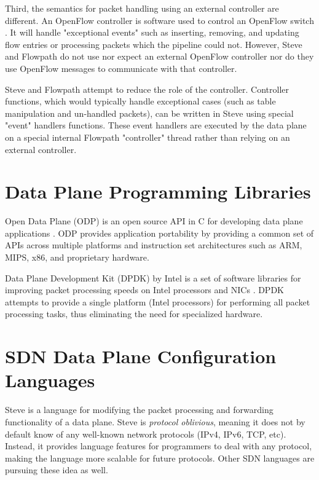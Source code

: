 Third, the semantics for packet handling using an external controller are different. An OpenFlow controller is software used to control an OpenFlow switch \cite{openflow_spec}. It will handle "exceptional events" such as inserting,
removing, and updating flow entries or processing packets which the pipeline
could not. However, Steve and Flowpath do not use nor expect an external
OpenFlow controller nor do they use OpenFlow messages to communicate with that
controller. 

Steve and Flowpath attempt to reduce the role of the controller. Controller
functions, which would typically handle exceptional cases (such as table
manipulation and un-handled packets), can be written in Steve using special
"event" handlers functions. These event handlers are executed by the data plane
on a special internal Flowpath "controller" thread rather than relying on an
external controller. 

\section{Data Plane Programming Libraries} \label{rel:dp_lib}

Open Data Plane (ODP) is an open source API in C for developing data plane applications \cite{odp_webpage}. ODP provides application portability by providing a common set of APIs across multiple platforms and instruction set architectures such as ARM, MIPS, x86, and proprietary hardware.

Data Plane Development Kit (DPDK) by Intel is a set of software libraries for improving packet processing speeds on Intel processors and NICs \cite{dpdk_webpage}. DPDK attempts to provide a single platform (Intel processors) for performing all packet processing tasks, thus eliminating the need for specialized hardware.

\section{SDN Data Plane Configuration Languages} \label{rel:p4}

Steve is a language for modifying the packet processing and forwarding functionality of a data plane. Steve is \textit{protocol oblivious}, meaning it does not by default
know of any well-known network protocols (IPv4, IPv6, TCP, etc). Instead, it
provides language features for programmers to deal with any protocol, making the
language more scalable for future protocols. Other SDN languages are pursuing
these idea as well.

